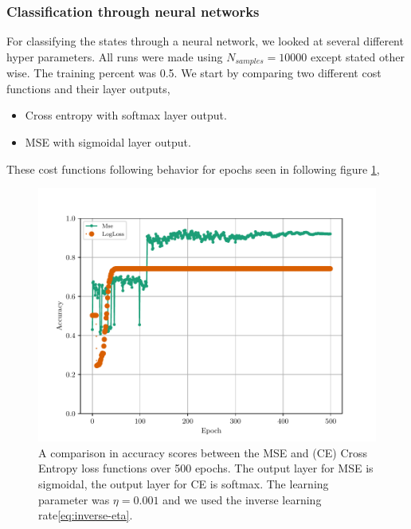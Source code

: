 \subsubsection{Classification through neural networks}
For classifying the states through a neural network, we looked at several different hyper parameters. All runs were made using $N_{samples}=10000$ except stated other wise. The training percent was 0.5. We start by comparing two different cost functions and their layer outputs,
\begin{itemize}
    \item Cross entropy with softmax layer output.
    \item MSE with sigmoidal layer output.
\end{itemize}
These cost functions following behavior for epochs seen in following figure \ref{fig:mlp-cost-function-comparison},
\begin{figure}[H]
    \centering
    \includegraphics[scale=1.0]{../fig/mlp_epoch_cost_functions.pdf}
    \caption{A comparison in accuracy scores between the MSE and (CE) Cross Entropy loss functions over 500 epochs. The output layer for MSE is sigmoidal, the output layer for CE is softmax. The learning parameter was $\eta=0.001$ and we used the inverse learning rate\eqref{eq:inverse-eta}.}
    \label{fig:mlp-cost-function-comparison}
\end{figure}

